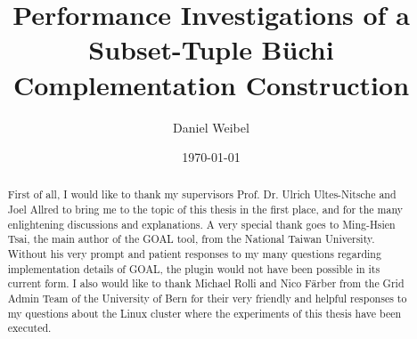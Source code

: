 \documentclass[standard]{styles/thesis}
\begin{document}
\title{Performance Investigations of a Subset-Tuple Büchi Complementation Construction}
\author{Daniel Weibel}
\date{\today}
\maketitle


\renewcommand{\abstractname}{Acknowledgements}
\begin{abstract}
First of all, I would like to thank my supervisors Prof. Dr. Ulrich Ultes-Nitsche and Joel Allred to bring me to the topic of this thesis in the first place, and for the many enlightening discussions and explanations. A very special thank goes to Ming-Hsien Tsai, the main author of the GOAL tool, from the National Taiwan University. Without his very prompt and patient responses to my many questions regarding implementation details of GOAL, the plugin would not have been possible in its current form. I also would like to thank Michael Rolli and Nico Färber from the Grid Admin Team of the University of Bern for their very friendly and helpful responses to my questions about the Linux cluster where the experiments of this thesis have been executed.
\end{abstract}

\tableofcontents

% 

%

%



% 

% 





\begin{figure}
\begin{center}
\Automaton
\end{center}
\end{figure}

\begin{figure}
\begin{center}
\RunTree
\end{center}
\end{figure}
\end{document}
